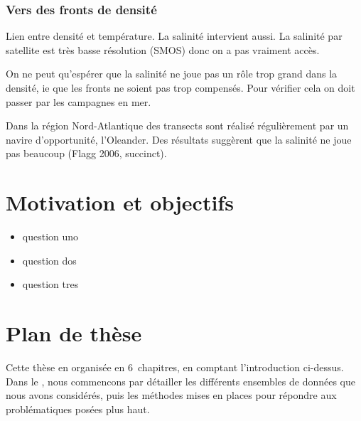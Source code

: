 \subsubsection{Vers des fronts de densité}

Lien entre densité et température.
La salinité intervient aussi. La salinité par satellite est très basse résolution (SMOS) donc on a pas vraiment accès.

On ne peut qu'espérer que la salinité ne joue pas un rôle trop grand dans la densité, ie que les fronts ne soient pas trop compensés.
Pour vérifier cela on doit passer par les campagnes en mer.

Dans la région Nord-Atlantique des transects sont réalisé régulièrement par un navire d'opportunité, l'Oleander.
Des résultats suggèrent que la salinité ne joue pas beaucoup (Flagg 2006, succinct).

\section{Motivation et objectifs}
\label{sec:problematique}

\begingroup
{}
\begin{itemize}
        \setlength{\topsep}{\baselineskip}
        \setlength{\itemsep}{\baselineskip}
        \renewcommand*\labelitemi{\adfrightarrowhead}
  \item question uno
  \item question dos
  \item question tres
\end{itemize}
\endgroup

\section{Plan de thèse}
\label{sec:plan-de-these}

Cette thèse en organisée en 6~chapitres, en comptant l'introduction ci-dessus.
Dans le , nous commencons par détailler les différents ensembles de données que nous avons considérés, puis les méthodes mises en places pour répondre aux problématiques posées plus haut.
